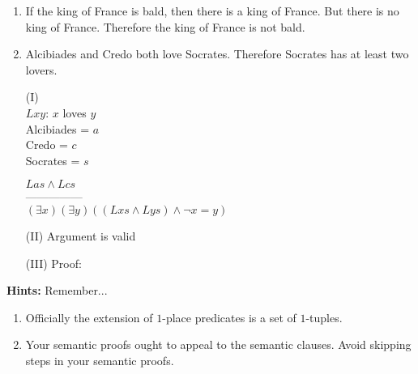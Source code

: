 \documentclass[12pt]{article}
\newcommand{\I}{\mathcal{I}} %
\newcommand{\VV}[2]{\mathcal{V}_{#1}^{#2}} %
\newcommand{\va}[1]{\hat{#1}} %
\newcommand{\answer}[1]{%
  \par\noindent
  \begin{tcolorbox}[colback=gray!10, colframe=gray!80, title=Proof]
    #1
  \end{tcolorbox}
}
\begin{document}
\begin{enumerate}
{        %

    }
  \item	If the king of France is bald, then there is a king of France. But there is no king of France. Therefore the king of France is not bald.
  \item Alcibiades and Credo both love Socrates. Therefore Socrates has at least two lovers.
  \answer{
    \begin{flushleft}
      (I) \\
      $Lxy$: $x$ loves $y$ \\
      Alcibiades = $a$ \\
      Credo = $c$ \\
      Socrates = $s$ \\
      
      \bigskip
      
      $Las \land Lcs$ \\
      --------------- \\
      $(\exists x) (\exists y) ((Lxs \land Lys) \land \lnot x=y)$
  \end{flushleft}
    (II) Argument is valid
    \bigskip
    
    (III) Proof:
  }
\end{enumerate}

\bigskip

\textbf{Hints:} Remember...

\begin{enumerate}
  \item Officially the extension of $1$-place predicates is a set of $1$-tuples.
  \item Your semantic proofs ought to appeal to the semantic clauses. Avoid skipping steps in your semantic proofs.
\end{enumerate}
\end{document}
